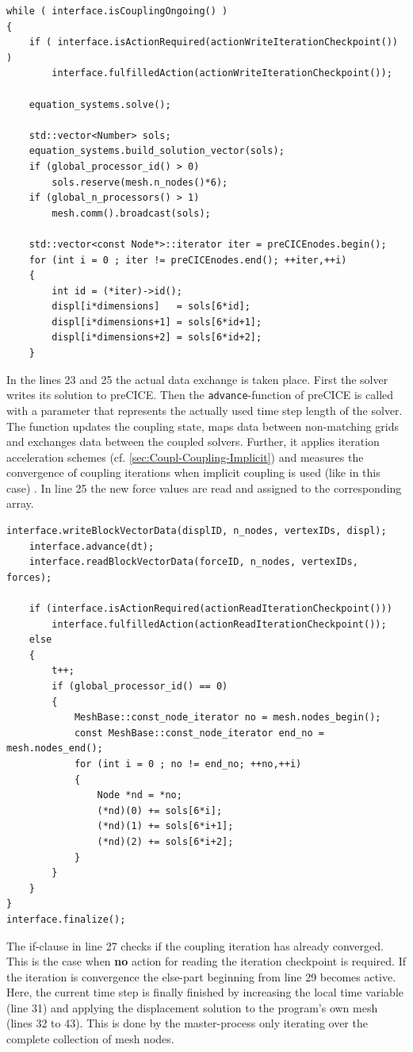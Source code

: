 \begin{lstlisting}[caption=preCICE main while-loop part 1,label=lst:preCICEint4a,keepspaces=true,name=while-loop]
while ( interface.isCouplingOngoing() )
{
	if ( interface.isActionRequired(actionWriteIterationCheckpoint()) )
		interface.fulfilledAction(actionWriteIterationCheckpoint());

	equation_systems.solve();

	std::vector<Number> sols;
	equation_systems.build_solution_vector(sols);
	if (global_processor_id() > 0)
		sols.reserve(mesh.n_nodes()*6);
	if (global_n_processors() > 1)
		mesh.comm().broadcast(sols);

	std::vector<const Node*>::iterator iter = preCICEnodes.begin();
	for (int i = 0 ; iter != preCICEnodes.end(); ++iter,++i)
	{
		int id = (*iter)->id();
		displ[i*dimensions]   = sols[6*id];
		displ[i*dimensions+1] = sols[6*id+1];
		displ[i*dimensions+2] = sols[6*id+2];
	}
\end{lstlisting}
   In the lines 23 and 25 the actual data exchange is taken place. First the solver writes its solution to preCICE. Then the \texttt{advance}-function of preCICE is called with a parameter that represents the actually used time step length of the solver. The function updates the coupling state, maps data between non-matching grids and exchanges data between the coupled solvers. Further, it applies iteration acceleration schemes (cf. \ref{sec:Coupl-Coupling-Implicit}) and measures the convergence of coupling iterations when implicit coupling is used (like in this case) \cite{gatzhammer2015efficient}. In line 25 the new force values are read and assigned to the corresponding array.

\begin{lstlisting}[caption=preCICE main while-loop part 2,label=lst:preCICEint4b,keepspaces=true,name=while-loop]
	interface.writeBlockVectorData(displID, n_nodes, vertexIDs, displ);
	interface.advance(dt);
	interface.readBlockVectorData(forceID, n_nodes, vertexIDs, forces);

	if (interface.isActionRequired(actionReadIterationCheckpoint()))
		interface.fulfilledAction(actionReadIterationCheckpoint());
	else
	{
		t++;
		if (global_processor_id() == 0)
		{
			MeshBase::const_node_iterator no = mesh.nodes_begin();
			const MeshBase::const_node_iterator end_no = mesh.nodes_end();
			for (int i = 0 ; no != end_no; ++no,++i)
			{
				Node *nd = *no;
				(*nd)(0) += sols[6*i];
				(*nd)(1) += sols[6*i+1];
				(*nd)(2) += sols[6*i+2];
			}
		}
	}
}
interface.finalize();
\end{lstlisting}
   The if-clause in line 27 checks if the coupling iteration has already converged. This is the case when \textbf{no} action for reading the iteration checkpoint is required. If the iteration is convergence the else-part beginning from line 29 becomes active. Here, the current time step is finally finished by increasing the local time variable (line 31) and applying the displacement solution to the program's own mesh (lines 32 to 43). This is done by the master-process only iterating over the complete collection of mesh nodes.
   
